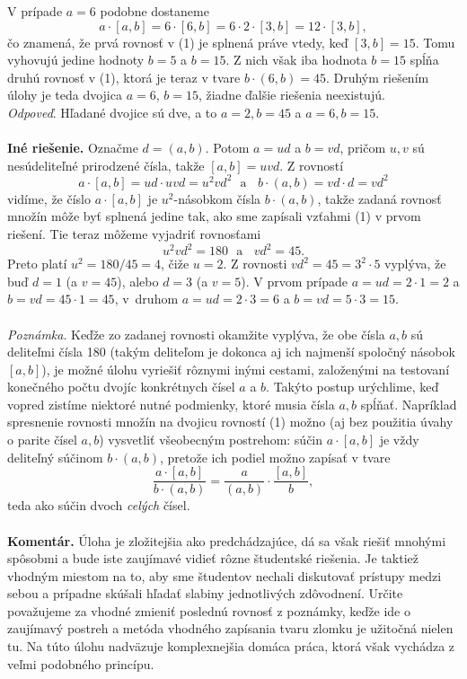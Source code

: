 \documentclass[11pt,a4paper,oneside,final]{book}
\newcommand{\kom}{\textbf{Komentár.} }
\begin{document}
V prípade $a = 6$ podobne dostaneme
$$a \cdot [a, b] = 6 \cdot [6, b] = 6 \cdot 2 \cdot [3, b] = 12 \cdot [3, b],$$
čo znamená, že prvá rovnosť v (1) je splnená práve vtedy, keď $[3, b] = 15$. Tomu vyhovujú jedine hodnoty $b = 5$ a $b = 15$. Z nich však iba hodnota $b = 15$ spĺňa druhú rovnosť v (1), ktorá je teraz v tvare $b\cdot(6, b) = 45$. Druhým riešením úlohy je teda dvojica $a = 6$, $b = 15$, žiadne ďalšie riešenia neexistujú.\\
\textit{Odpoveď}. Hľadané dvojice sú dve, a to $a = 2, b = 45$ a $a = 6, b = 15$.\\
\\
\textbf{Iné riešenie.} Označme $d = (a, b)$. Potom $a = ud$ a $b = vd$, pričom $u, v$ sú nesúdeliteľné prirodzené čísla, takže $[a, b] = uvd$. Z rovností
$$a \cdot [a, b] = ud \cdot uvd = u^2vd^2 \ \ \ \text{a} \ \ \ \ b \cdot (a, b) = vd \cdot d = vd^2$$
vidíme, že číslo $a \cdot [a, b]$ je $u^2$-násobkom čísla $b \cdot (a, b)$, takže zadaná rovnosť množín môže byť splnená jedine tak, ako sme zapísali vzťahmi (1) v prvom riešení. Tie teraz môžeme vyjadriť rovnosťami
$$u^2vd^2= 180 \ \ \  \text{a} \ \ \ \ vd^2= 45.$$
Preto platí $u^2 =180/45= 4$, čiže $u = 2$. Z rovnosti $vd^2 = 45 = 3^2 \cdot 5$ vyplýva, že buď $d = 1$ (a $v = 45$), alebo $d = 3$ (a $v = 5$). V prvom prípade $a = ud = 2 \cdot 1 = 2$ a $b = vd = 45 \cdot 1 = 45$, v~druhom $a = ud = 2 \cdot 3 = 6$ a $b = vd = 5 \cdot 3 = 15$.\\
\\
\textit{Poznámka}. Keďže zo zadanej rovnosti okamžite vyplýva, že obe čísla $a, b$ sú deliteľmi čísla 180 (takým deliteľom je dokonca aj ich najmenší spoločný násobok $[a, b]$), je možné úlohu vyriešiť rôznymi inými cestami, založenými na testovaní konečného počtu dvojíc konkrétnych čísel $a$ a $b$. Takýto postup urýchlime, keď vopred zistíme niektoré nutné podmienky, ktoré musia čísla $a, b$ spĺňať. Napríklad spresnenie rovnosti množín na dvojicu rovností (1) možno (aj bez použitia úvahy o parite čísel $a, b$) vysvetliť všeobecným postrehom: súčin $a \cdot [a, b]$ je vždy deliteľný súčinom $b \cdot (a, b)$, pretože ich
podiel možno zapísať v tvare
$$ \frac{a \cdot [a, b]}{b \cdot (a, b)}=\frac{a}{(a, b)}\cdot\frac{[a, b]}{b},$$
teda ako súčin dvoch \textit{celých} čísel.\\
\\
\kom Úloha je zložitejšia ako predchádzajúce, dá sa však riešiť mnohými spôsobmi a bude iste zaujímavé vidieť rôzne študentské riešenia. Je taktiež vhodným miestom na to, aby sme študentov nechali diskutovať prístupy medzi sebou a prípadne skúšali hľadať slabiny jednotlivých zdôvodnení. Určite považujeme za vhodné zmieniť poslednú rovnosť z poznámky, keďže ide o zaujímavý postreh a metóda vhodného zapísania tvaru zlomku je užitočná nielen tu. Na túto úlohu nadväzuje komplexnejšia domáca práca, ktorá však vychádza z veľmi podobného princípu.\\
\end{document}
